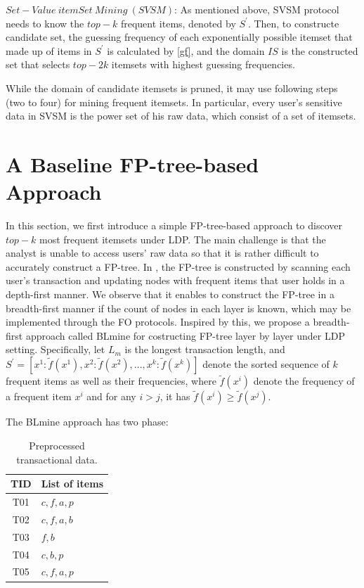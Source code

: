 \documentclass[conference]{IEEEtran}
\begin{document}
$Set-Value\ itemSet\ Mining\ (SVSM)$: As mentioned above, SVSM protocol needs to know the $top-k$ frequent items, denoted by $S^{\prime}$. Then, to constructe candidate set, the guessing frequency of each  exponentially possible itemset that made up of items in $S^{\prime}$ is calculated by \eqref{gf}, and the domain $IS$ is the constructed set that selects $top-2k$ itemsets with highest guessing frequencies.

While the domain of candidate itemsets is pruned, it may use following steps (two to four) for mining frequent itemsets. In particular, every user's sensitive data in SVSM is the power set of his raw data, which  consist of a set of itemsets.

\section{A Baseline FP-tree-based Approach}
In this section, we first introduce a simple FP-tree-based approach to discover $top-k$ most frequent itemsets under LDP. The main challenge is that the analyst is unable to access users' raw data so that it is rather difficult to accurately construct a FP-tree. In \cite{fp}, the FP-tree is constructed by scanning each user's transaction and updating nodes with frequent items that user holds in a depth-first manner. We observe that it enables to construct the FP-tree in a breadth-first manner if the count of nodes in each layer is known, which may be implemented through the FO protocols. Inspired by this, we propose a breadth-first approach {\color{red}called BLmine} for costructing FP-tree layer by layer under LDP setting. Specifically, 
let $L_m$ is the longest transaction length, and $S^{\prime} = \left [ x^1 : \tilde{f}(x^1),  x^2 : \tilde{f}(x^2),...,x^k : \tilde{f}(x^k) \right ]$ denote the sorted sequence of $k$ frequent items as well as their frequencies, where $\tilde{f}(x^i)$ denote the frequency of a frequent item $x^i$ and for any $i>j$, it has $\tilde{f}(x^i) \geq \tilde{f}(x^j)$. 


The {\color{red} BLmine} approach has two phase:\\

\begin{table}[tb]
\caption{{\color{red}Preprocessed transactional data.}}
\label{preprocessed trans}
\centering
\begin{tabular}{|c|l|}\hline
  TID&List of items \\\hline
  T01&$c,f,a,p$ \\\hline
  T02&$c,f,a,b$ \\\hline
  T03&$f,b$ \\\hline
  T04&$c,b,p$ \\\hline
  T05&$c,f,a,p$ \\\hline
\end{tabular}
\end{table}
\end{document}
